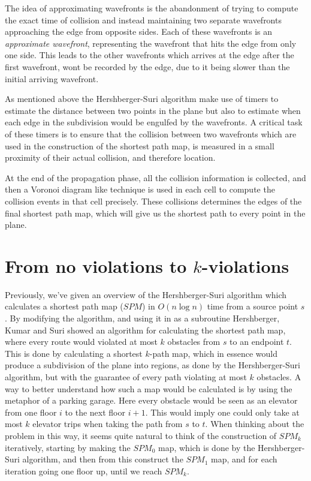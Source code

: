 The idea of approximating wavefronts is the abandonment of trying to compute the exact 
time of collision and instead maintaining two separate wavefronts approaching the edge 
from opposite sides. Each of these wavefronts is an \textit{approximate wavefront}, 
representing the wavefront that hits the edge from only one side. This leads to the 
other wavefronts which arrives at the edge after the first wavefront, wont be recorded by 
the edge, due to it being slower than the initial arriving wavefront.

As mentioned above the Hershberger-Suri algorithm make use of timers to estimate the 
distance between two points in the plane but also to estimate when each edge in the 
subdivision would be engulfed by the wavefronts. A critical task of these timers is to 
ensure that the collision between two wavefronts which are used in the construction of 
the shortest path map, is measured in a small proximity of their actual collision, and 
therefore location.

At the end of the propagation phase, all the collision information is collected, and 
then a Voronoi diagram like technique is used in each cell to compute the collision 
events in that cell precisely. These collisions determines the edges of the final 
shortest path map, which will give us the shortest path to every point in the plane.

\section{From no violations to $k$-violations}

Previously, we've given an overview of the Hershberger-Suri algorithm which calculates a 
shortest path map ($SPM$) in $O(n\log n)$ time from a source point $s$ 
\cite{HershbergerS99}. By modifying the algorithm, and using it in as a subroutine 
Hershberger, Kumar and Suri showed an algorithm for calculating the shortest path map, 
where every route would violated at most $k$ obstacles from $s$ to an endpoint 
$t$\cite{HershbergerKS17}. This  is done by calculating a shortest $k$-path map, which in 
essence would produce a subdivision of the plane into regions, as done by the 
Hershberger-Suri algorithm, but with the guarantee of every path violating at most $k$ 
obstacles. A way to better understand how such a map would be calculated is by using the 
metaphor of a parking garage. Here every obstacle would be seen as an elevator from one 
floor $i$ to the next floor $i+1$. This would imply one could only take at most $k$ 
elevator trips when taking the path from $s$ to $t$. When thinking about the problem in 
this way, it seems quite natural to think of the construction of $SPM_k$ iteratively, 
starting by making the $SPM_0$ map, which is done by the Hershberger-Suri algorithm, and 
then from this construct the $SPM_1$ map, and for each iteration going one floor up, 
until we reach $SPM_{k}$.

